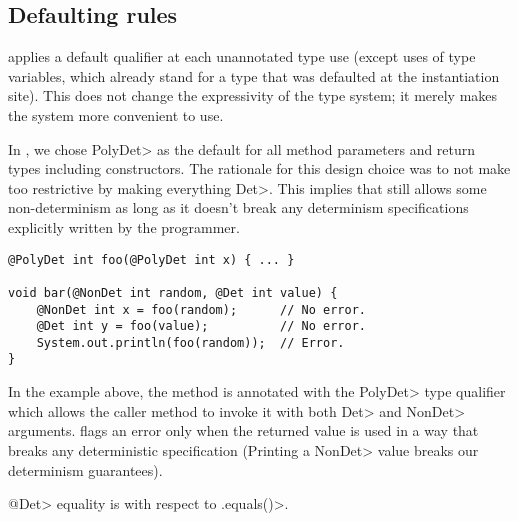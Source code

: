 \subsection{Defaulting rules}\label{defaulting}

\TheDeterminismChecker applies a default qualifier at each unannotated type
use (except uses of type variables, which already stand for a type that was
defaulted at the instantiation site).
This does not change the expressivity of the type system; it merely makes
the system more convenient to use.

In \theDeterminismChecker, we chose \<PolyDet> as the default for all 
method parameters and return types including constructors.
The rationale for this design choice was to not make \theDeterminismChecker too restrictive by making everything \<Det>.  This implies that
\theDeterminismChecker still allows some non-determinism as long as it doesn't break any determinism specifications explicitly written by the programmer.

\begin{verbatim}
@PolyDet int foo(@PolyDet int x) { ... }

void bar(@NonDet int random, @Det int value) {
    @NonDet int x = foo(random);      // No error.
    @Det int y = foo(value);          // No error.
    System.out.println(foo(random));  // Error.
}
\end{verbatim}
In the example above, the method  is annotated with the \<PolyDet> type qualifier which allows
the caller method  to invoke it with both \<Det> and \<NonDet> arguments. \TheDeterminismChecker flags an error 
only when the returned value is used in a way that breaks any deterministic specification (Printing a \<NonDet> value
breaks our determinism guarantees).


\<@Det> equality is with respect to \<.equals()>.


